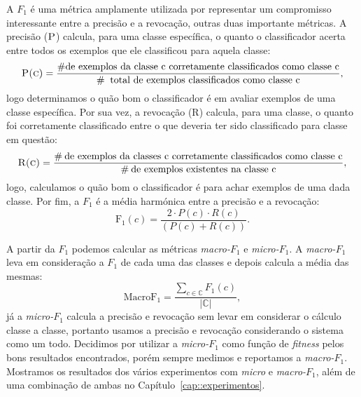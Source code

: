 A \textit{$F_1$} é uma métrica amplamente utilizada por representar um compromisso interessante entre a precisão e a revocação, outras duas importante métricas. 
A precisão ($\textsc{P}$) calcula, para uma classe específica, o quanto o classificador acerta entre todos os exemplos que ele classificou para aquela classe: 
\begin{equation}
\textsc{P(c)} = \frac{\# \text{de exemplos da classe c corretamente classificados como classe c}} {\# \: \text{ total de exemplos classificados como classe c}} \\,
\end{equation}
logo determinamos o quão bom o classificador é em avaliar exemplos de uma classe específica. 
Por sua vez, a revocação (\textsc{R}) calcula, para uma classe, o quanto foi corretamente classificado entre o que deveria ter sido classificado para classe em questão:
\begin{equation}
\textsc{R(c)} = \frac{\# \: \text{de exemplos da classes c corretamente classificados como classe c}}{\# \: \text{de exemplos existentes na classe c}},                      
\end{equation}
logo, calculamos o quão bom o classificador é para achar exemplos de uma dada classe. 
Por fim, a \textit{$F_1$} é a média harmónica entre a precisão e a revocação:
\begin{equation}
\text{F}_1(c) = \frac{2 \cdot P(c) \cdot R(c)}{(P(c) + R(c))}.
\end{equation}

A partir da $F_1$ podemos calcular as métricas \textit{macro-$F_1$} e \textit{micro-$F_1$}. A \textit{macro-$F_1$} leva em consideração a $F_1$ de cada uma das classes e depois calcula a média das mesmas:
\begin{equation}
\text{MacroF}_1 = \frac{\sum\limits_{c \in \mathbb{C}} F_1(c) } { |\mathbb{C}| },
\end{equation}
já a \textit{micro-$F_1$} calcula a precisão e revocação sem levar em considerar o cálculo classe a classe, portanto usamos a precisão e revocação considerando o sistema como um todo. Decidimos por utilizar a \textit{micro-$F_1$} como função de \textit{fitness} pelos bons resultados encontrados, porém sempre medimos e reportamos a \textit{macro-$F_1$}. Mostramos os resultados dos vários experimentos com \textit{micro} e \textit{macro-$F_1$}, além de uma combinação de ambas no Capítulo~\ref{cap::experimentos}.

\algrenewcommand{}
\algrenewcommand{}
\algrenewcommand{}
\algrenewcommand{} %

